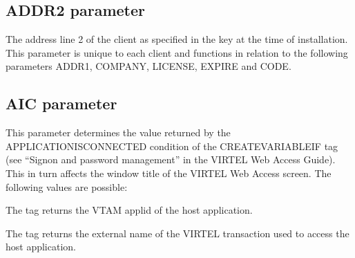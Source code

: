 \documentclass[letterpaper,10pt,english]{sphinxmanual}
\begin{document}
\ignorespaces 

\subsection{ADDR2 parameter}
\label{\detokenize{Installation_Guide:addr2-parameter}}\label{\detokenize{Installation_Guide:index-32}}
\begin{sphinxVerbatim}[commandchars=\\\{\}]
 
\end{sphinxVerbatim}

\sphinxAtStartPar
The address line 2 of the client as specified in the key at the time of installation. This parameter is unique to each client and functions in relation to the following parameters ADDR1, COMPANY, LICENSE, EXPIRE and CODE.

\ignorespaces 

\subsection{AIC parameter}
\label{\detokenize{Installation_Guide:aic-parameter}}\label{\detokenize{Installation_Guide:index-33}}
\begin{sphinxVerbatim}[commandchars=\\\{\}]
 
\end{sphinxVerbatim}

\sphinxAtStartPar
This parameter determines the value returned by the APPLICATION\sphinxhyphen{}IS\sphinxhyphen{}CONNECTED condition of the CREATE\sphinxhyphen{}VARIABLEIF tag (see “Signon and password management” in the VIRTEL Web Access Guide). This in turn affects the window title of the VIRTEL Web Access screen. The following values are possible:

\sphinxAtStartPar
{} \sphinxhyphen{} The tag returns the VTAM applid of the host application.

\sphinxAtStartPar
{} \sphinxhyphen{} The tag returns the external name of the VIRTEL transaction used to access the host application.
\end{document}
